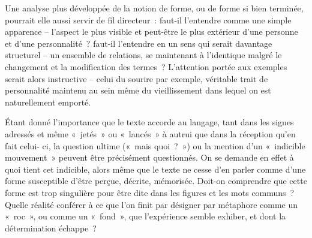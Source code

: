 {Une analyse plus développée de la notion de forme, ou de forme si bien terminée,
pourrait elle aussi servir de fil directeur~: faut-il l'entendre comme une simple
apparence – l'aspect le plus visible et peut-être le plus extérieur d'une personne et
d'une personnalité~? faut-il l'entendre en un sens qui serait davantage structurel –
un ensemble de relations, se maintenant à l'identique malgré le changement et la
modification des termes~? L'attention portée aux exemples serait alors instructive –
celui du sourire par exemple, véritable trait de personnalité maintenu au sein même du
vieillissement dans lequel on est naturellement emporté.

Étant donné l'importance que le texte accorde au langage, tant dans les signes
adressés et même «~jetés~» ou «~lancés~» à autrui que dans la réception qu'en fait celui-
ci, la question ultime («~mais quoi~?~») ou la mention d'un «~indicible mouvement~»
peuvent être précisément questionnés. On se demande en effet à quoi tient cet
indicible, alors même que le texte ne cesse d'en parler comme d'une forme susceptible
d'être perçue, décrite, mémorisée. Doit-on comprendre que cette forme est trop
singulière pour être dite dans les figures et les mots communs~? Quelle réalité conférer
à ce que l'on finit par désigner par métaphore comme un «~roc~», ou comme un
«~fond~», que l'expérience semble exhiber, et dont la détermination échappe~?}%
